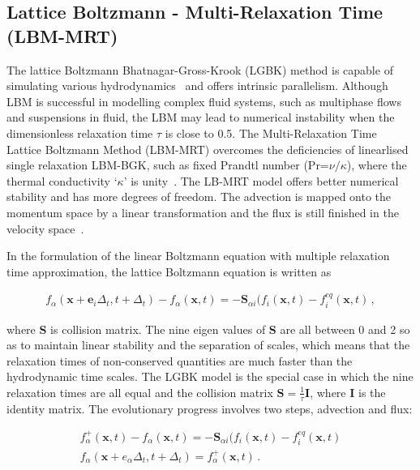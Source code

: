\subsection{Lattice Boltzmann - Multi-Relaxation Time (LBM-MRT)}

The lattice Boltzmann Bhatnagar-Gross-Krook (LGBK) method is capable of 
simulating various hydrodynamics~\citep{Succi1989, Succi2001} and offers 
intrinsic parallelism. Although LBM is successful in modelling complex fluid 
systems, such as multiphase flows and suspensions in fluid, the LBM may lead to 
numerical instability when the dimensionless relaxation time $\tau$ is close to 
0.5. The Multi-Relaxation Time Lattice Boltzmann Method (LBM-MRT) overcomes the 
deficiencies of linearlised single relaxation LBM-BGK, such as fixed Prandtl 
number (Pr=$\nu/\kappa$), where the thermal conductivity `$\kappa$' is 
unity~\citep{Liu2003a}. The LB-MRT model offers better numerical stability and 
has more degrees of freedom. The advection is mapped onto the momentum space by 
a linear transformation and the flux is still finished in the velocity 
space~\citep{Du2006}.

In the formulation of the linear Boltzmann equation with multiple relaxation 
time approximation, the lattice Boltzmann equation is written as

\begin{align}
f_{\alpha}(\mathbf{x}+\mathbf{e}_i\Delta_t, t+ 
\Delta_t)-f_{\alpha}(\mathbf{x},t)=-\mathbf{S}_{\alpha 
i}(f_i(\mathbf{x},t)-f_i^{eq}(\mathbf{x},t)\,,
\end{align}

\noindent where \textbf{S} is collision matrix. The nine eigen values of 
\textbf{S} are all between 0 and 2 so as to maintain linear stability and the 
separation of scales, which means that the relaxation times of non-conserved 
quantities are much faster than the hydrodynamic time scales. The LGBK model is 
the special case in which the nine relaxation times are all equal and the 
collision matrix $\mathbf{S}=\frac{1}{\tau}\mathbf{I}$, where \textbf{I} is the 
identity matrix. The evolutionary progress involves two steps, advection and 
flux:

\begin{gather}
f_{\alpha}^+(\mathbf{x},t)-f_{\alpha}(\mathbf{x},t) = -\mathbf{S}_{\alpha i}(f_i(\mathbf{x},t)-f_i^{eq}(\mathbf{x},t) \label{eq:advection}\\
f_{\alpha}(\mathbf{x}+e_{\alpha}\Delta_t, t+\Delta_t) = 
f_{\alpha}^+(\mathbf{x},t)\,.
\end{gather}

